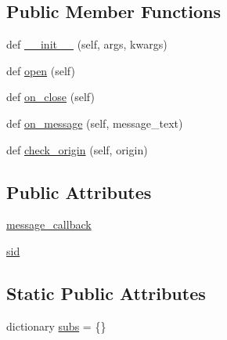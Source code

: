 \subsection*{Public Member Functions}
\begin{DoxyCompactItemize}
\item 
def \hyperlink{classparlai_1_1chat__service_1_1services_1_1websocket_1_1sockets_1_1MessageSocketHandler_a68a930a675ce483852fc323e0f302381}{\+\_\+\+\_\+init\+\_\+\+\_\+} (self, args, kwargs)
\item 
def \hyperlink{classparlai_1_1chat__service_1_1services_1_1websocket_1_1sockets_1_1MessageSocketHandler_a3b5c9e9fc500c312e1895c6220d52ca7}{open} (self)
\item 
def \hyperlink{classparlai_1_1chat__service_1_1services_1_1websocket_1_1sockets_1_1MessageSocketHandler_ac86fc08a0abf8acabaab0949d579ffb1}{on\+\_\+close} (self)
\item 
def \hyperlink{classparlai_1_1chat__service_1_1services_1_1websocket_1_1sockets_1_1MessageSocketHandler_a6e45176bf280b1c9b90b93f933af5e00}{on\+\_\+message} (self, message\+\_\+text)
\item 
def \hyperlink{classparlai_1_1chat__service_1_1services_1_1websocket_1_1sockets_1_1MessageSocketHandler_a3f2a94972e7e7564c361b4045983ab35}{check\+\_\+origin} (self, origin)
\end{DoxyCompactItemize}
\subsection*{Public Attributes}
\begin{DoxyCompactItemize}
\item 
\hyperlink{classparlai_1_1chat__service_1_1services_1_1websocket_1_1sockets_1_1MessageSocketHandler_ae97ee5ffb1b97863c68c32bbe89cde5e}{message\+\_\+callback}
\item 
\hyperlink{classparlai_1_1chat__service_1_1services_1_1websocket_1_1sockets_1_1MessageSocketHandler_a5e574f1ab05ba9d4749f4d4c2fe6e6d2}{sid}
\end{DoxyCompactItemize}
\subsection*{Static Public Attributes}
\begin{DoxyCompactItemize}
\item 
dictionary \hyperlink{classparlai_1_1chat__service_1_1services_1_1websocket_1_1sockets_1_1MessageSocketHandler_a9a7875987a4e46a7526c8c230c52c00f}{subs} = \{\}
\end{DoxyCompactItemize}


